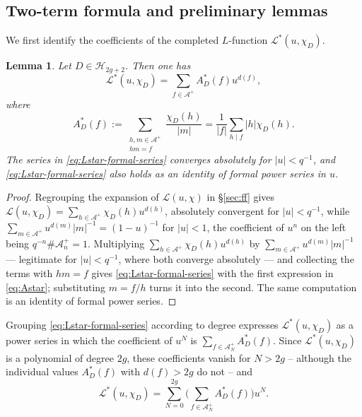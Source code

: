 \documentclass[a4paper,reqno]{amsart}
\numberwithin{equation}{section}
\newtheorem{lemma}[theorem]{Lemma}
\theoremstyle{remark}
\theoremstyle{definition}
\newcommand{\A}{\mathcal{A}}
\begin{document}
\subsection{Two-term formula and preliminary lemmas}

We first identify the coefficients of the completed $L$-function
$\mathcal L^*(u,\chi_D)$.

\begin{lemma}
Let $D\in\mathcal H_{2g+2}$. Then one has 
\begin{equation}\label{eq:Lstar-formal-series}
\mathcal L^*(u,\chi_D)
=
\sum_{f\in\A^+}A_D^*(f)u^{d(f)},
\end{equation}
where
\begin{equation}\label{eq:Astar}
A_D^*(f)
:=
\sum_{\substack{h,m\in\A^+\\ hm=f}}
\frac{\chi_D(h)}{|m|}
=
\frac{1}{|f|}
\sum_{h\mid f}|h|\chi_D(h).
\end{equation}
The series in \eqref{eq:Lstar-formal-series} converges absolutely for
$|u|<q^{-1}$, and \eqref{eq:Lstar-formal-series} also holds as an identity
of formal power series in $u$.
\end{lemma}

\begin{proof}
Regrouping the expansion of $\mathcal L(u,\chi)$ in \S\ref{sec:ff} gives
$\mathcal L(u,\chi_D)=\sum_{h\in\A^+}\chi_D(h)u^{d(h)}$, absolutely
convergent for $|u|<q^{-1}$, while
$\sum_{m\in\A^+}u^{d(m)}|m|^{-1}=(1-u)^{-1}$ for $|u|<1$, the coefficient of
$u^n$ on the left being $q^{-n}\#\A_n^+=1$. Multiplying
$\sum_{h\in\A^+}\chi_D(h)u^{d(h)}$ by $\sum_{m\in\A^+}u^{d(m)}|m|^{-1}$ ---
legitimate for $|u|<q^{-1}$, where both converge absolutely --- and
collecting the terms with $hm=f$ gives \eqref{eq:Lstar-formal-series} with the first expression
in \eqref{eq:Astar}; substituting $m=f/h$ turns it into the second. The same
computation is an identity of formal power series.
\end{proof}

Grouping \eqref{eq:Lstar-formal-series} according to degree expresses
$\mathcal L^*(u,\chi_D)$ as a power series in which the coefficient of $u^N$
is $\sum_{f\in\A_N^+}A_D^*(f)$. Since $\mathcal L^*(u,\chi_D)$ is a
polynomial of degree $2g$, these coefficients vanish for $N>2g$ -- although
the individual values $A_D^*(f)$ with $d(f)>2g$ do not -- and
\begin{equation}\label{eq:Lstar-by-degree}
\mathcal L^*(u,\chi_D)
=
\sum_{N=0}^{2g}
\Biggl(
\sum_{f\in\A_N^+}A_D^*(f)
\Biggr)u^N.
\end{equation}
\end{document}
